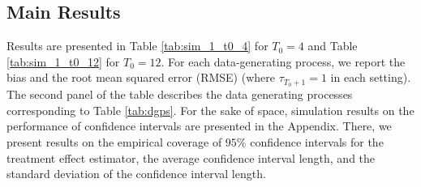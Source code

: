 \documentclass[12pt]{article}
\begin{document}
\subsection{Main Results}

Results are presented in Table \ref{tab:sim_1_t0_4} for $T_0 = 4$ and Table \ref{tab:sim_1_t0_12} for $T_0 = 12$. For each data-generating process, we report the bias and the root mean squared error (RMSE) (where $\tau_{T_0 + 1} = 1$ in each setting). The second panel of the table describes the data generating processes corresponding to Table \ref{tab:dgps}. For the sake of space, simulation results on the performance of confidence intervals are presented in the Appendix. There, we present results on the empirical coverage of $95\%$ confidence intervals for the treatment effect estimator, the average confidence interval length, and the standard deviation of the confidence interval length.
\end{document}
